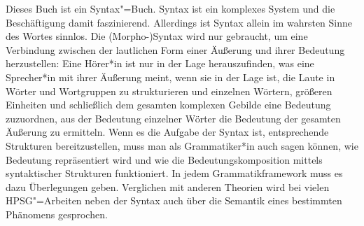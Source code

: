 Dieses Buch ist ein Syntax"=Buch. Syntax ist ein komplexes System und die Beschäftigung damit
faszinierend. Allerdings ist Syntax allein im wahrsten Sinne des Wortes sinnlos. Die (Morpho-)Syntax wird nur gebraucht, um eine
Verbindung zwischen der lautlichen Form einer Äußerung und ihrer Bedeutung herzustellen: Eine
Hörer*in ist nur in der Lage herauszufinden, was eine Sprecher*in mit ihrer Äußerung meint, wenn
sie in der Lage ist, die Laute in Wörter und Wortgruppen zu strukturieren und einzelnen Wörtern,
größeren Einheiten und schließlich dem gesamten komplexen Gebilde
eine Bedeutung zuzuordnen, \dash aus der Bedeutung einzelner Wörter die Bedeutung der gesamten
Äußerung zu ermitteln. Wenn es die Aufgabe der Syntax ist, entsprechende Strukturen bereitzustellen,
muss man als Grammatiker*in auch sagen können, wie Bedeutung repräsentiert wird und wie die
Bedeutungskomposition mittels syntaktischer Strukturen funktioniert. In jedem Grammatikframework
muss es dazu Überlegungen geben. Verglichen mit anderen Theorien wird bei vielen HPSG"=Arbeiten
neben der Syntax auch über die Semantik eines bestimmten Phänomens gesprochen.

